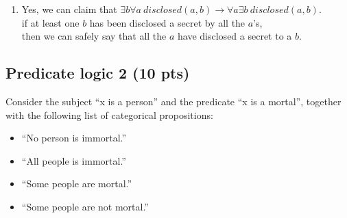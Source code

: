 \documentclass[12pt]{article}
\begin{document}
\begin{enumerate}
	\subitem  
\item Yes, we can claim that $\exists b \forall a ~disclosed(a, b) \rightarrow \forall a \exists b~disclosed(a, b)$.\\
 if at least one $b$ has been disclosed a secret by all the $a$'s,\\ 
 then we can safely say that all the $a$ have disclosed a secret to a $b$.
\end{enumerate} 


\newpage

\subsection{Predicate logic 2 (10 pts)}

\noindent Consider the subject ``x is a person'' and the predicate ``x is a mortal'', together with the following list of categorical propositions:
\begin{itemize}
\item ``No person is immortal.''

\item ``All people is immortal.''

\item ``Some people are mortal.''	

\item ``Some people are not mortal.''	
\end{itemize} 
\end{document}
